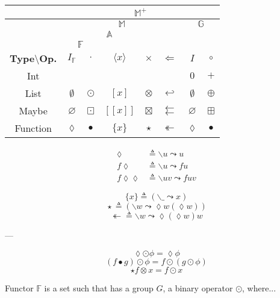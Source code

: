 \documentclass{jsarticle}
\def\[{[\![}
\def\]{]\!]}
\newcommand{\htypeclassname}[1]{\mathbb{#1}}
\newcommand{\identity}{I}
\newcommand{\binaryop}{\circ}
\newcommand{\listtype}[1]{[#1]}
\newcommand{\maybetype}[1]{\[#1\]}
\newcommand{\functype}[1]{\{#1\}}
\newcommand{\hrightarrow}{\leadsto}
\newcommand{\hlambdaparameter}{\lozenge}
\newcommand{\hfmap}{\cdot}
\newcommand{\hlistfmap}{\odot}
\newcommand{\hmaybefmap}{\boxdot}
\newcommand{\hfuncfmap}{\bullet}
\newcommand{\hemptylist}{\emptyset}
\newcommand{\hnothing}{\varnothing}
\newcommand{\hid}{\hlambdaparameter}
\newcommand{\hlambda}{\backslash}
\newcommand{\hlambdaparameterignore}{\_}
\newcommand{\hpure}[1]{\langle#1\rangle}
\newcommand{\hpurelist}[1]{\listtype{#1}}
\newcommand{\hpuremaybe}[1]{\maybetype{#1}}
\newcommand{\hpurefunc}[1]{\functype{#1}}
\newcommand{\hpurefuncimp}[1]{(\hlambda\hlambdaparameterignore\hrightarrow#1)}
\newcommand{\hafmap}{\times}
\newcommand{\hlistafmap}{\otimes}
\newcommand{\hmaybeafmap}{\boxtimes}
\newcommand{\hfuncafmap}{\star}
\newcommand{\hfuncafmapimp}[1]{(\hlambda#1\hrightarrow\hlambdaparameter#1(\hlambdaparameter#1))}
\newcommand{\hbind}{\Leftarrow}
\newcommand{\hlistbind}{\hookleftarrow}
\newcommand{\hmaybebind}{\leftleftarrows}
\newcommand{\hlistplus}{\oplus}
\newcommand{\hmaybeplus}{\boxplus}
\newcommand{\hmfbind}{\twoheadleftarrow}
\newcommand{\hmfbindimp}[1]{\hlambda#1\hrightarrow\hlambdaparameter(\hlambdaparameter#1)#1}
\begin{document}
\begin{center}
\begin{tabular}{||c||c|c|c|c|c|c|c||}
\hline
{ }
    &\multicolumn{7}{|c||}{$\htypeclassname{M}^+$}\\
\hline
{ }
    &\multicolumn{5}{|c|}{$\htypeclassname{M}$}
    &\multicolumn{2}{|c||}{$\htypeclassname{G}$}\\
\hline
{ }
    &\multicolumn{4}{|c|}{$\htypeclassname{A}$}
    &
    &\multicolumn{2}{|c||}{ }\\
\hline
{ }
    &\multicolumn{2}{|c|}{$\htypeclassname{F}$}
    &\multicolumn{2}{|c|}{ }
    &
    &\multicolumn{2}{|c||}{ }\\
\hline
\textbf{Type$\setminus$Op.}
    &$\identity_\htypeclassname{F}$
    &$\hfmap$
    &$\hpure{x}$
    &$\hafmap$
    &$\hbind$
    &$\identity$
    &$\binaryop$\\
\hline\hline
Int
    &
    &
    &
    &
    &
    &$0$
    &$+$\\
\hline
List
    &$\hemptylist$
    &$\hlistfmap$
    &$\hpurelist{x}$
    &$\hlistafmap$
    &$\hlistbind$
    &$\hemptylist$
    &$\hlistplus$\\
\hline
Maybe
    &$\hnothing$
    &$\hmaybefmap$
    &$\hpuremaybe{x}$
    &$\hmaybeafmap$
    &$\hmaybebind$
    &$\hnothing$
    &$\hmaybeplus$\\
\hline
Function
    &$\hid$
    &$\hfuncfmap$
    &$\hpurefunc{x}$
    &$\hfuncafmap$
    &$\hmfbind$
    &$\hid$
    &$\hfuncfmap$\\
\hline
\end{tabular}
\end{center}

\begin{align*}
\hlambdaparameter&\triangleq\hlambda u\hrightarrow u\\
f\hlambdaparameter&\triangleq\hlambda u\hrightarrow fu\\
f\hlambdaparameter\hlambdaparameter&\triangleq\hlambda uv\hrightarrow fuv
\end{align*}


$$\hpurefunc{x}\triangleq\hpurefuncimp{x}$$
$${}\hfuncafmap{}\triangleq\hfuncafmapimp{w}$$
$${}\hmfbind{}\triangleq\hmfbindimp{w}$$

---

$$\lozenge\odot\phi=\lozenge\phi$$
$$(f\bullet g)\odot\phi=f\odot(g\odot\phi)$$
$$\star f\otimes x=f\odot x$$


Functor $\htypeclassname{F}$ is a set such that has a group $G$, a binary operator $\odot$, where...
\end{document}
